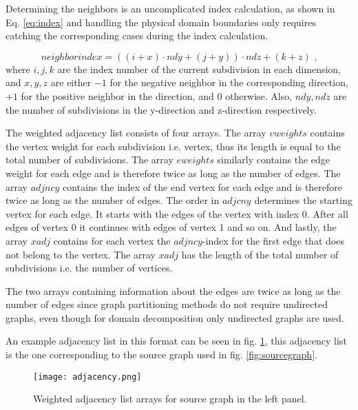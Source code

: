 Determining the neighbors is an uncomplicated index calculation, as shown in Eq. \ref{eq:index} and handling the physical domain boundaries only requires catching the corresponding cases during the index calculation.

\begin{equation}
neighborindex = \left(\left(i + x\right) \cdot ndy + \left(j + y\right)\right) \cdot ndz + \left(k + z\right) \text{ ,}
\label{eq:index}
\end{equation}
where $i, j, k$ are the index number of the current subdivision in each dimension, and $x, y, z$ are either $-1$ for the negative neighbor in the corresponding direction, $+1$ for the positive neighbor in the direction, and $0$ otherwise. 
Also, $ndy, ndz$ are the number of subdivisions in the y-direction and z-direction respectively.

The weighted adjacency list consists of four arrays.
The array $vweights$ contains the vertex weight for each subdivision i.e. vertex, thus its length is equal to the total number of subdivisions.
The array $eweights$ similarly contains the edge weight for each edge and is therefore twice as long as the number of edges.
The array $adjncy$ contains the index of the end vertex for each edge and is therefore twice as long as the number of edges.
The order in $adjcny$ determines the starting vertex for each edge.
It starts with the edges of the vertex with index 0.
After all edges of vertex 0 it continues with edges of vertex 1 and so on.
And lastly, the array $xadj$ contains for each vertex the $adjncy$-index for the first edge that does not belong to the vertex.
The array $xadj$ has the length of the total number of subdivisions i.e. the number of vertices.

The two arrays containing information about the edges are twice as long as the number of edges since graph partitioning methods do not require undirected graphs, even though for domain decomposition only undirected graphs are used.

An example adjacency list in this format can be seen in fig. \ref{fig:adjacency}, this adjacency list is the one corresponding to the source graph used in fig. \ref{fig:sourcegraph}.

\begin{figure}[!htbp]
  \centering
  \texttt{[image: adjacency.png]}
  \caption{Weighted adjacency list arrays for source graph in the left panel.}
  \label{fig:adjacency}
\end{figure}

